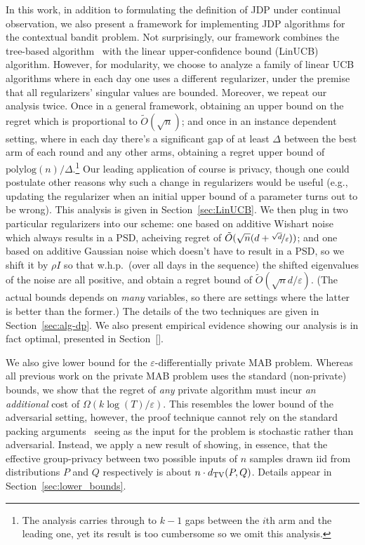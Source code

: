 \documentclass{article}
\begin{document}
In this work, in addition to formulating the definition of JDP under
continual observation, we also present a framework for implementing
JDP algorithms for the contextual bandit problem. Not surprisingly,
our framework combines the tree-based algorithm~\cite{ChanPrivateContinualRelease2010,DworkContinualObservation2010}  with the linear
upper-confidence bound (LinUCB) algorithm.  However, for modularity,
we choose to analyze a family of linear UCB algorithms where in each
day one uses a different regularizer, under the premise that all
regularizers' singular values are bounded. Moreover, we repeat our analysis twice. Once in a general framework,
obtaining an upper bound on the regret which is proportional to
$\tilde O(\sqrt n)$; and once in an instance dependent setting, where in each
day there's a significant gap of at least $\Delta$ between the best arm of each round and any other
arms, obtaining a regret upper bound of $\mathrm{polylog}(n)/\Delta$.\footnote{The analysis carries through to $k-1$ gaps between the $i$th
arm and the leading one, yet its result is too cumbersome so we omit
this analysis.} Our leading application of course is privacy, though
one could postulate other reasons why such a change in regularizers
would be useful (e.g., updating the regularizer when an initial upper
bound of a parameter turns out to be wrong). This analysis is given in Section~\ref{sec:LinUCB}. We then plug in two
particular regularizers into our scheme: one based on additive Wishart
noise~\citep{SheffetPrivateApproxRegression2015} which always results
in a PSD, acheiving regret of $\tilde O(\sqrt{n}(d+\nicefrac{\sqrt d}{\varepsilon}))$; and one based on additive Gaussian
noise \citep{DworkAnalyzeGauss2014} which doesn't have to result in a PSD, so
we shift it by $\rho I$ so that w.h.p.\ (over all days in the sequence)
the shifted eigenvalues of the noise are all positive, and obtain a regret bound of $\tilde O(\sqrt n d/\varepsilon)$. (The actual bounds depends on \emph{many} variables, so there are settings where the latter is better than the former.) The details of the two techniques are given in Section~\ref{sec:alg-dp}.  We also present
empirical evidence showing our analysis is in fact optimal, presented in Section~\ref{}.

We also give lower bound for the $\varepsilon$-differentially private
MAB problem. Whereas all previous work on the private MAB problem uses
the standard (non-private) bounds, we show that the regret of
\emph{any} private algorithm must incur \emph{an additional} cost of
$\Omega(k\log(T)/\varepsilon)$. This resembles the lower bound of the
adversarial setting, however, the proof technique cannot rely on the
standard packing arguments~\citep[e.g.][]{HardtTalwarGeometryDP2010} seeing as the input for the
problem is stochastic rather than adversarial.  Instead, we apply a
new result of \citet{KarwaVadhanFiniteSampleDP2017} showing, in essence,
that the effective group-privacy between two possible inputs of $n$
samples drawn iid from distributions $P$ and $Q$ respectively is about
$n\cdot d_{\rm TV}(P,Q)$. Details appear in Section~\ref{sec:lower_bounds}.
\end{document}
